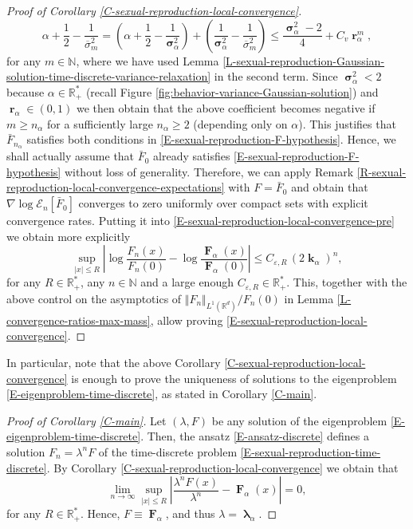 \documentclass[reqno]{amsart}
\DeclareMathOperator{\blambda}{\boldsymbol{\lambda}}
\DeclareMathOperator{\bsigma}{\boldsymbol{\sigma}}
\DeclareMathOperator{\bF}{\boldsymbol{F}}
\DeclareMathOperator{\bk}{\boldsymbol{k}}
\DeclareMathOperator{\br}{\boldsymbol{r}}
\numberwithin{equation}{section}
\begin{document}
{\begin{proof}[Proof of Corollary \ref{C-sexual-reproduction-local-convergence}]
$$\alpha+\frac{1}{2}-\frac{1}{\overline{\sigma}_m^2}=\left(\alpha+\frac{1}{2}-\frac{1}{\bsigma_\alpha^2}\right)+\left(\frac{1}{\bsigma_\alpha^2}-\frac{1}{\overline{\sigma}_m^2}\right)\leq \frac{\bsigma_\alpha^2-2}{4}+C_v\br_\alpha^m,$$
for any $m\in \mathbb{N}$, where we have used Lemma \ref{L-sexual-reproduction-Gaussian-solution-time-discrete-variance-relaxation} in the second term. Since $\bsigma_\alpha^2<2$ because $\alpha\in \mathbb{R}_+^*$ (recall Figure \ref{fig:behavior-variance-Gaussian-solution}) and $\br_\alpha\in (0,1)$ we then obtain that the above coefficient becomes negative if $m\geq n_\alpha$ for a sufficiently large $n_\alpha\geq 2$ (depending only on $\alpha$). This justifies that $\bar F_{n_\alpha}$ satisfies both conditions in \eqref{E-sexual-reproduction-F-hypothesis}. Hence, we shall actually assume that $\bar F_0$ already satisfies \eqref{E-sexual-reproduction-F-hypothesis} without loss of generality. Therefore, we can apply Remark \ref{R-sexual-reproduction-local-convergence-expectations} with $F=\bar F_0$ and obtain that $\nabla\log\mathcal{E}_n[\bar F_0]$ converges to zero uniformly over compact sets with explicit convergence rates. Putting it into \eqref{E-sexual-reproduction-local-convergence-pre} we obtain more explicitly
$$\sup_{\vert x\vert \leq R} \left\vert \log \frac{F_n(x)}{F_n(0)}-\log\frac{\bF_\alpha(x)}{\bF_\alpha(0)}\right\vert \leq C_{\varepsilon,R}\,(2\bk_\alpha)^n,$$
for any $R\in \mathbb{R}_+^*$, any $n\in \mathbb{N}$ and a large enough $C_{\varepsilon,R}\in \mathbb{R}_+^*$. This, together with the above control on the asymptotics of $\Vert F_n\Vert_{L^1(\mathbb{R}^d)}/F_n(0)$ in Lemma \ref{L-convergence-ratios-max-mass}, allow proving \eqref{E-sexual-reproduction-local-convergence}.
\end{proof}

In particular, note that the above Corollary \ref{C-sexual-reproduction-local-convergence} is enough to prove the uniqueness of solutions to the eigenproblem \eqref{E-eigenproblem-time-discrete}, as stated in Corollary \ref{C-main}.

\begin{proof}[Proof of Corollary \ref{C-main}]
Let $(\lambda,F)$ be any solution of the eigenproblem \eqref{E-eigenproblem-time-discrete}. Then, the ansatz \eqref{E-ansatz-discrete} defines a solution $F_n=\lambda^n F$ of the time-discrete problem \eqref{E-sexual-reproduction-time-discrete}. By Corollary \ref{C-sexual-reproduction-local-convergence} we obtain that
$$\lim_{n\rightarrow \infty}\sup_{\vert x\vert\leq R}\left\vert \frac{\lambda^n F(x)}{\lambda^n}-\bF_\alpha(x)\right\vert=0,$$
for any $R\in \mathbb{R}_+^*$. Hence, $F\equiv\bF_\alpha$, and thus $\lambda=\blambda_\alpha$.
\end{proof}


}
\end{document}

